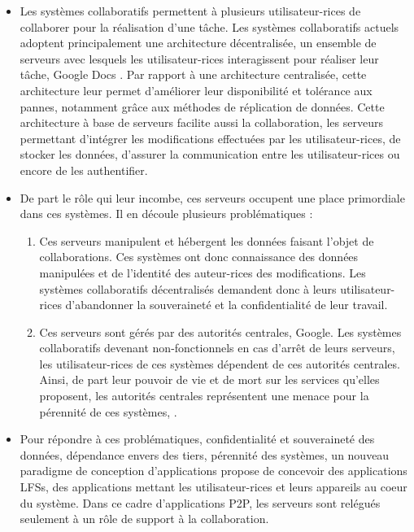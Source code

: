 \begin{itemize}
    \item Les systèmes collaboratifs permettent à plusieurs utilisateur-rices de collaborer pour la réalisation d'une tâche.
        Les systèmes collaboratifs actuels adoptent principalement une architecture décentralisée, \ie un ensemble de serveurs avec lesquels les utilisateur-rices interagissent pour réaliser leur tâche, \eg Google Docs \cite{gdocs}.
        Par rapport à une architecture centralisée, cette architecture leur permet d'améliorer leur disponibilité et tolérance aux pannes, notamment grâce aux méthodes de réplication de données.
        Cette architecture à base de serveurs facilite aussi la collaboration, les serveurs permettant d'intégrer les modifications effectuées par les utilisateur-rices, de stocker les données, d'assurer la communication entre les utilisateur-rices ou encore de les authentifier.
    \item De part le rôle qui leur incombe, ces serveurs occupent une place primordiale dans ces systèmes.
        Il en découle plusieurs problématiques :
        \begin{enumerate}
            \item Ces serveurs manipulent et hébergent les données faisant l'objet de collaborations.
                Ces systèmes ont donc connaissance des données manipulées et de l'identité des auteur-rices des modifications.
                Les systèmes collaboratifs décentralisés demandent donc à leurs utilisateur-rices d'abandonner la souveraineté et la confidentialité de leur travail.
            \item Ces serveurs sont gérés par des autorités centrales, \eg Google.
                Les systèmes collaboratifs devenant non-fonctionnels en cas d'arrêt de leurs serveurs, les utilisateur-rices de ces systèmes dépendent de ces autorités centrales.
                Ainsi, de part leur pouvoir de vie et de mort sur les services qu'elles proposent, les autorités centrales représentent une menace pour la pérennité de ces systèmes, \eg \cite{2022-killed-by-google}.
        \end{enumerate}
    \item Pour répondre à ces problématiques, \ie confidentialité et souveraineté des données, dépendance envers des tiers, pérennité des systèmes, un nouveau paradigme de conception d'applications propose de concevoir des applications \acp{LFS}, \ie des applications mettant les utilisateur-rices et leurs appareils au coeur du système.
        Dans ce cadre d'applications \ac{P2P}, les serveurs sont relégués seulement à un rôle de support à la collaboration.

\end{itemize}
